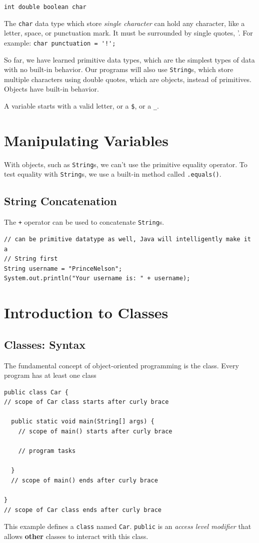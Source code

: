 \documentclass[a4paper, 12pt]{article}
\begin{document}
\verb|int double boolean char|

The \verb|char| data type which store \textit{single character} can hold any character, like a letter, space, or punctuation mark. It must be surrounded by single quotes, '. For example:
\verb|char punctuation = '!';|

So far, we have learned primitive data types, which are the simplest types of data with no built-in behavior. Our programs will also use \verb|String|s, which store multiple characters using double quotes, which are objects, instead of primitives. Objects have built-in behavior.

A variable starts with a valid letter, or a \verb|$|, or a \verb|_|.


\section{Manipulating Variables}
With objects, such as \verb|String|s, we can't use the primitive equality operator. To test equality with \verb|String|s, we use a built-in method called \verb|.equals()|.
\subsection{String Concatenation}
The \verb|+| operator can be used to concatenate \verb|String|s.
\begin{verbatim}
// can be primitive datatype as well, Java will intelligently make it a 
// String first
String username = "PrinceNelson";
System.out.println("Your username is: " + username);
\end{verbatim}


\section{Introduction to Classes}
\subsection{Classes: Syntax}
The fundamental concept of object-oriented programming is the class. Every program has at least one class
\begin{verbatim}
public class Car {
// scope of Car class starts after curly brace

  public static void main(String[] args) {
    // scope of main() starts after curly brace

    // program tasks

  }
  // scope of main() ends after curly brace

}
// scope of Car class ends after curly brace
\end{verbatim}
This example defines a \verb|class| named \verb|Car|. \verb|public| is an \textit{access level modifier} that allows \textbf{other} classes to interact with this class.
\end{document}
